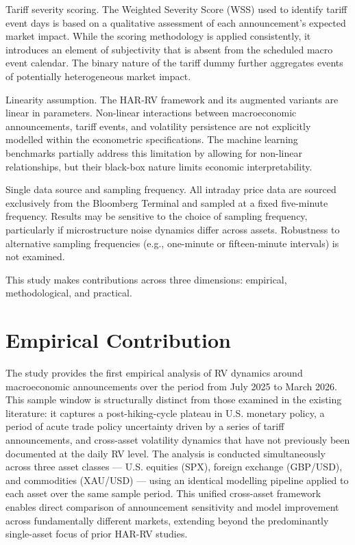 \documentclass[12pt,a4paper]{report}
\begin{document}
Tariff severity scoring. The Weighted Severity Score (WSS) used to identify tariff event days is based on a qualitative assessment of each announcement's expected market impact. While the scoring methodology is applied consistently, it introduces an element of subjectivity that is absent from the scheduled macro event calendar. The binary nature of the tariff dummy further aggregates events of potentially heterogeneous market impact.

Linearity assumption. The HAR-RV framework and its augmented variants are linear in parameters. Non-linear interactions between macroeconomic announcements, tariff events, and volatility persistence are not explicitly modelled within the econometric specifications. The machine learning benchmarks partially address this limitation by allowing for non-linear relationships, but their black-box nature limits economic interpretability.

Single data source and sampling frequency. All intraday price data are sourced exclusively from the Bloomberg Terminal and sampled at a fixed five-minute frequency. Results may be sensitive to the choice of sampling frequency, particularly if microstructure noise dynamics differ across assets. Robustness to alternative sampling frequencies (e.g., one-minute or fifteen-minute intervals) is not examined.

This study makes contributions across three dimensions: empirical, methodological, and practical.

\section{Empirical Contribution}
The study provides the first empirical analysis of RV dynamics around macroeconomic announcements over the period from July 2025 to March 2026. This sample window is structurally distinct from those examined in the existing literature: it captures a post-hiking-cycle plateau in U.S. monetary policy, a period of acute trade policy uncertainty driven by a series of tariff announcements, and cross-asset volatility dynamics that have not previously been documented at the daily RV level. The analysis is conducted simultaneously across three asset classes --- U.S. equities (SPX), foreign exchange (GBP/USD), and commodities (XAU/USD) --- using an identical modelling pipeline applied to each asset over the same sample period. This unified cross-asset framework enables direct comparison of announcement sensitivity and model improvement across fundamentally different markets, extending beyond the predominantly single-asset focus of prior HAR-RV studies.
\end{document}
